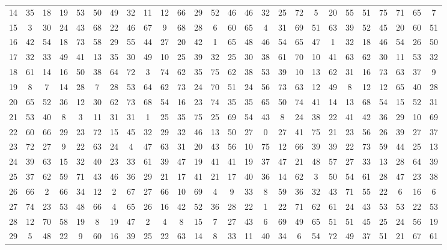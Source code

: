 \begin{table}
\begin{tabular}{c c c c c c c c c c c c c c c c c c c c c c c c c c }
14 & 35 & 18 & 19 & 53 & 50 & 49 & 32 & 11 & 12 & 66 & 29 & 52 & 46 & 46 & 32 & 25 & 72 & 5 & 20 & 55 & 51 & 75 & 71 & 65 & 7 \\
15 & 3 & 30 & 24 & 43 & 68 & 22 & 46 & 67 & 9 & 68 & 28 & 6 & 60 & 65 & 4 & 31 & 69 & 51 & 63 & 39 & 52 & 45 & 20 & 60 & 51 \\
16 & 42 & 54 & 18 & 73 & 58 & 29 & 55 & 44 & 27 & 20 & 42 & 1 & 65 & 48 & 46 & 54 & 65 & 47 & 1 & 32 & 18 & 46 & 54 & 26 & 50 \\
17 & 32 & 33 & 49 & 41 & 13 & 35 & 30 & 49 & 10 & 25 & 39 & 32 & 25 & 30 & 38 & 61 & 70 & 10 & 41 & 63 & 62 & 30 & 11 & 53 & 32 \\
18 & 61 & 14 & 16 & 50 & 38 & 64 & 72 & 3 & 74 & 62 & 35 & 75 & 62 & 38 & 53 & 39 & 10 & 13 & 62 & 31 & 16 & 73 & 63 & 37 & 9 \\
19 & 8 & 7 & 14 & 28 & 7 & 28 & 53 & 64 & 62 & 73 & 24 & 70 & 51 & 24 & 56 & 73 & 63 & 12 & 49 & 8 & 12 & 12 & 65 & 40 & 28 \\
20 & 65 & 52 & 36 & 12 & 30 & 62 & 73 & 68 & 54 & 16 & 23 & 74 & 35 & 35 & 65 & 50 & 74 & 41 & 14 & 13 & 68 & 54 & 15 & 52 & 31 \\
21 & 53 & 40 & 8 & 3 & 11 & 31 & 31 & 1 & 25 & 35 & 75 & 25 & 69 & 54 & 43 & 8 & 24 & 38 & 22 & 41 & 42 & 36 & 29 & 10 & 69 \\
22 & 60 & 66 & 29 & 23 & 72 & 15 & 45 & 32 & 29 & 32 & 46 & 13 & 50 & 27 & 0 & 27 & 41 & 75 & 21 & 23 & 56 & 26 & 39 & 27 & 37 \\
23 & 72 & 27 & 9 & 22 & 63 & 24 & 4 & 47 & 63 & 31 & 20 & 43 & 56 & 10 & 75 & 12 & 66 & 39 & 39 & 22 & 73 & 59 & 44 & 25 & 13 \\
24 & 39 & 63 & 15 & 32 & 40 & 23 & 33 & 61 & 39 & 47 & 19 & 41 & 41 & 19 & 37 & 47 & 21 & 48 & 57 & 27 & 33 & 13 & 28 & 64 & 39 \\
25 & 37 & 62 & 59 & 71 & 43 & 46 & 36 & 29 & 21 & 17 & 41 & 21 & 17 & 40 & 36 & 14 & 62 & 3 & 50 & 54 & 61 & 28 & 47 & 23 & 38 \\
26 & 66 & 2 & 66 & 34 & 12 & 2 & 67 & 27 & 66 & 10 & 69 & 4 & 9 & 33 & 8 & 59 & 36 & 32 & 43 & 71 & 55 & 22 & 6 & 16 & 6 \\
27 & 74 & 23 & 53 & 48 & 66 & 4 & 65 & 26 & 16 & 42 & 52 & 36 & 28 & 22 & 1 & 22 & 71 & 62 & 61 & 24 & 43 & 53 & 53 & 22 & 53 \\
28 & 12 & 70 & 58 & 19 & 8 & 19 & 47 & 2 & 4 & 8 & 15 & 7 & 27 & 43 & 6 & 69 & 49 & 65 & 51 & 51 & 45 & 25 & 24 & 56 & 19 \\
29 & 5 & 48 & 22 & 9 & 60 & 16 & 39 & 25 & 22 & 63 & 14 & 8 & 33 & 11 & 40 & 34 & 6 & 54 & 72 & 49 & 37 & 51 & 21 & 67 & 61 \\

\end{tabular}
\end{table}
